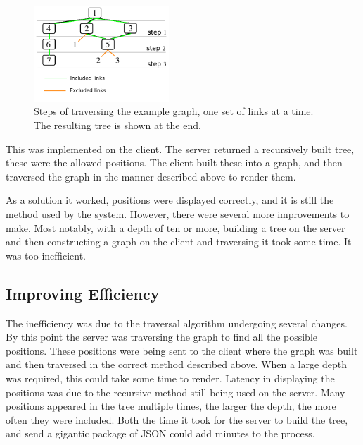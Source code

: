 \begin{figure}[h]
\includegraphics[width=2in]{Images/3/tree-2-full}
\caption{Steps of traversing the example graph, one set of links at a time. The resulting tree is shown at the end.}
\label{3_levels}
\end{figure}

This was implemented on the client. The server returned a recursively built tree, these were the allowed positions. The client built these into a graph, and then traversed the graph in the manner described above to render them. 

As a solution it worked, positions were displayed correctly, and it is still the method used by the system. However, there were several more improvements to make. Most notably, with a depth of ten or more, building a tree on the server and then constructing a graph on the client and traversing it took some time. It was too inefficient.

\subsection{Improving Efficiency}
The inefficiency was due to the traversal algorithm undergoing several changes. By this point the server was traversing the graph to find all the possible positions. These positions were being sent to the client where the graph was built and then traversed in the correct method described above. When a large depth was required, this could take some time to render. Latency in displaying the positions was due to the recursive method still being used on the server. Many positions appeared in the tree multiple times, the larger the depth, the more often they were included. Both the time it took for the server to build the tree, and send a gigantic package of JSON could add minutes to the process.

